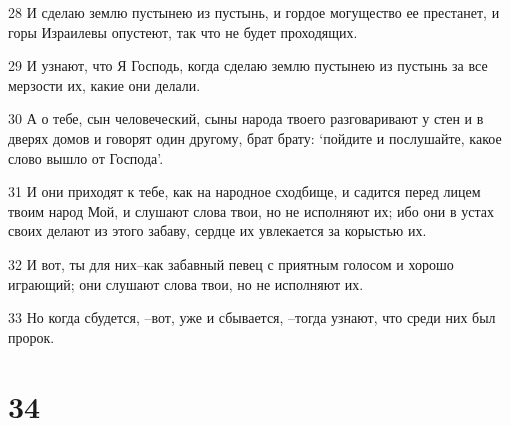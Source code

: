 \par 28 И сделаю землю пустынею из пустынь, и гордое могущество ее престанет, и горы Израилевы опустеют, так что не будет проходящих.
\par 29 И узнают, что Я Господь, когда сделаю землю пустынею из пустынь за все мерзости их, какие они делали.
\par 30 А о тебе, сын человеческий, сыны народа твоего разговаривают у стен и в дверях домов и говорят один другому, брат брату: `пойдите и послушайте, какое слово вышло от Господа'.
\par 31 И они приходят к тебе, как на народное сходбище, и садится перед лицем твоим народ Мой, и слушают слова твои, но не исполняют их; ибо они в устах своих делают из этого забаву, сердце их увлекается за корыстью их.
\par 32 И вот, ты для них--как забавный певец с приятным голосом и хорошо играющий; они слушают слова твои, но не исполняют их.
\par 33 Но когда сбудется, --вот, уже и сбывается, --тогда узнают, что среди них был пророк.

\chapter{34}

